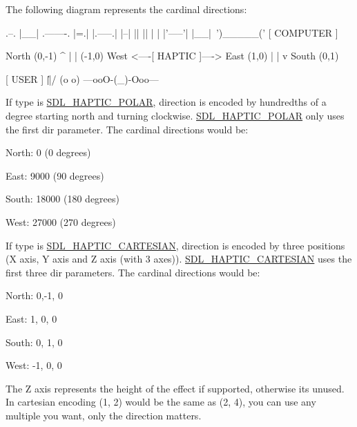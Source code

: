 The following diagram represents the cardinal directions\+: \begin{DoxyVerb}              .--.
              |__| .-------.
              |=.| |.-----.|
              |--| ||     ||
              |  | |'-----'|
              |__|~')_____('
                [ COMPUTER ]


                  North (0,-1)
                      ^
                      |
                      |
(-1,0)  West <----[ HAPTIC ]----> East (1,0)
                      |
                      |
                      v
                   South (0,1)


                   [ USER ]
                     \|||/
                     (o o)
               ---ooO-(_)-Ooo---\end{DoxyVerb}


If type is \mbox{\hyperlink{_s_d_l__haptic_8h_acdc35e97e5525472054a67b76e518f3b}{S\+D\+L\+\_\+\+H\+A\+P\+T\+I\+C\+\_\+\+P\+O\+L\+AR}}, direction is encoded by hundredths of a degree starting north and turning clockwise. \mbox{\hyperlink{_s_d_l__haptic_8h_acdc35e97e5525472054a67b76e518f3b}{S\+D\+L\+\_\+\+H\+A\+P\+T\+I\+C\+\_\+\+P\+O\+L\+AR}} only uses the first {\ttfamily dir} parameter. The cardinal directions would be\+:
\begin{DoxyItemize}
\item North\+: 0 (0 degrees)
\item East\+: 9000 (90 degrees)
\item South\+: 18000 (180 degrees)
\item West\+: 27000 (270 degrees)
\end{DoxyItemize}

If type is \mbox{\hyperlink{_s_d_l__haptic_8h_af8b2430a363a968de2a5b64c8f663d3b}{S\+D\+L\+\_\+\+H\+A\+P\+T\+I\+C\+\_\+\+C\+A\+R\+T\+E\+S\+I\+AN}}, direction is encoded by three positions (X axis, Y axis and Z axis (with 3 axes)). \mbox{\hyperlink{_s_d_l__haptic_8h_af8b2430a363a968de2a5b64c8f663d3b}{S\+D\+L\+\_\+\+H\+A\+P\+T\+I\+C\+\_\+\+C\+A\+R\+T\+E\+S\+I\+AN}} uses the first three {\ttfamily dir} parameters. The cardinal directions would be\+:
\begin{DoxyItemize}
\item North\+: 0,-\/1, 0
\item East\+: 1, 0, 0
\item South\+: 0, 1, 0
\item West\+: -\/1, 0, 0
\end{DoxyItemize}

The Z axis represents the height of the effect if supported, otherwise it\textquotesingle{}s unused. In cartesian encoding (1, 2) would be the same as (2, 4), you can use any multiple you want, only the direction matters.

